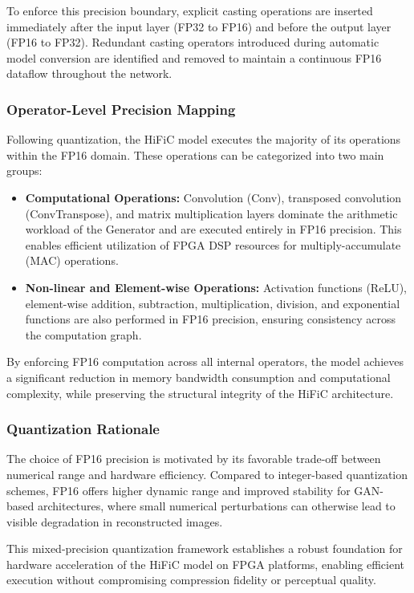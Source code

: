 To enforce this precision boundary, explicit casting operations are inserted immediately after the input layer (FP32 to FP16) and before the output layer (FP16 to FP32). Redundant casting operators introduced during automatic model conversion are identified and removed to maintain a continuous FP16 dataflow throughout the network.

\subsubsection{Operator-Level Precision Mapping}

Following quantization, the HiFiC model executes the majority of its operations within the FP16 domain. These operations can be categorized into two main groups:

\begin{itemize}
    \item \textbf{Computational Operations:} Convolution (Conv), transposed convolution (ConvTranspose), and matrix multiplication layers dominate the arithmetic workload of the Generator and are executed entirely in FP16 precision. This enables efficient utilization of FPGA DSP resources for multiply-accumulate (MAC) operations.
    \item \textbf{Non-linear and Element-wise Operations:} Activation functions (ReLU), element-wise addition, subtraction, multiplication, division, and exponential functions are also performed in FP16 precision, ensuring consistency across the computation graph.
\end{itemize}

By enforcing FP16 computation across all internal operators, the model achieves a significant reduction in memory bandwidth consumption and computational complexity, while preserving the structural integrity of the HiFiC architecture.

\subsubsection{Quantization Rationale}

The choice of FP16 precision is motivated by its favorable trade-off between numerical range and hardware efficiency. Compared to integer-based quantization schemes, FP16 offers higher dynamic range and improved stability for GAN-based architectures, where small numerical perturbations can otherwise lead to visible degradation in reconstructed images.

This mixed-precision quantization framework establishes a robust foundation for hardware acceleration of the HiFiC model on FPGA platforms, enabling efficient execution without compromising compression fidelity or perceptual quality.

